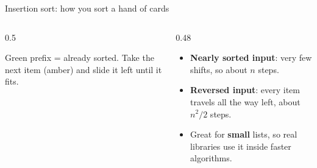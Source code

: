 \documentclass[aspectratio=169,10pt]{beamer}
\begin{document}
\begin{frame}{Insertion sort: how you sort a hand of cards}
\begin{columns}[T]
\begin{column}{0.5\textwidth}
\begin{sfig}[0.7]
\begin{tikzpicture}
  
\end{tikzpicture}
\end{sfig}
{\small Green prefix = already sorted. Take the next item (amber) and slide it left until it fits.}
\end{column}
\begin{column}{0.48\textwidth}
\vspace{2mm}
{\small
\begin{itemize}\setlength\itemsep{2pt}
\item \textbf{Nearly sorted input}: very few shifts, so about $n$ steps.
\item \textbf{Reversed input}: every item travels all the way left, about $n^2/2$ steps.
\item Great for \textbf{small} lists, so real libraries use it inside faster algorithms.
\end{itemize}}
\end{column}
\end{columns}
\end{frame}
\end{document}
